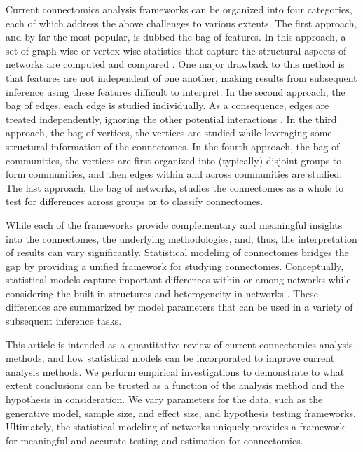 Current connectomics analysis frameworks can be organized into four categories, each of which address the above challenges to various extents.
The first approach, and by far the most popular, is dubbed the bag of features. In this approach, a set of graph-wise or vertex-wise statistics that capture the structural aspects of networks are computed and compared \citep{Bullmore2010-ew,mhembere2013computing}. One major drawback to this method is that features are not independent of one another, making results from subsequent inference using these features difficult to interpret.
In the second approach, the bag of edges, each edge is studied individually. As a consequence, edges are treated independently, ignoring the other potential interactions \citep{Craddock2013-qs,Varoquaux2010-tc}. 
In the third approach, the bag of vertices, the vertices are studied while leveraging some structural information of the connectomes.
In the fourth approach, the bag of communities, the vertices are first organized into (typically) disjoint groups to form communities, and then edges within and across communities are studied. The last approach, the bag of networks, studies the connectomes as a whole to test for differences across groups or to classify connectomes.

While each of the frameworks provide complementary and meaningful insights into the connectomes, the underlying methodologies, and, thus, the interpretation of results can vary significantly. Statistical modeling of connectomes bridges the gap by providing a unified framework for studying connectomes. Conceptually, statistical models capture important differences within or among networks while considering the built-in structures and heterogeneity in networks \citep{Zheng2009-df,athreya2017statistical,arroyo2019inference, zhang2018network}. These differences are summarized by model parameters that can be used in a variety of subsequent inference tasks. 

This article is intended as a quantitative review of current connectomics analysis methods, and how statistical models can be incorporated to improve current analysis methods. We perform empirical investigations to demonstrate to what extent conclusions can be trusted as a function of the analysis method and the hypothesis in consideration. We vary parameters for the data, such as the generative model, sample size, and effect size, and hypothesis testing frameworks. Ultimately, the statistical modeling of networks uniquely provides a framework for meaningful and accurate testing and estimation for connectomics.

